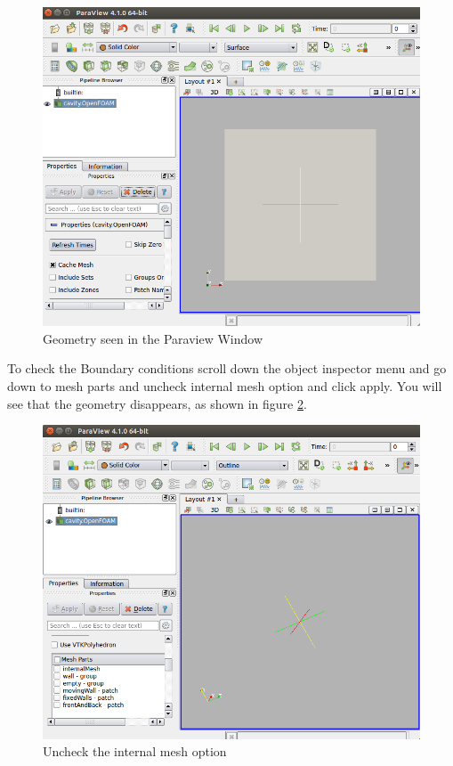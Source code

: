 \documentclass[a4paper,12pt]{report}
\begin{document}
\begin{figure}[ht]  
\begin{center}  
\includegraphics[scale=0.32]{13.png}
\caption{Geometry seen in the Paraview Window}
\label{13}
\end{center}  
\end{figure}

\flushleft To check the Boundary conditions scroll down the object inspector menu and go down to mesh parts and uncheck internal mesh option and click apply. You will see that the geometry disappears, as shown in figure \ref{14}.
\vspace{15cm}
\begin{figure}[ht]  
\begin{center}  
\includegraphics[scale=0.32]{14.png}
\caption{Uncheck the internal mesh option}
\label{14}
\end{center}  
\end{figure}
\end{document}
